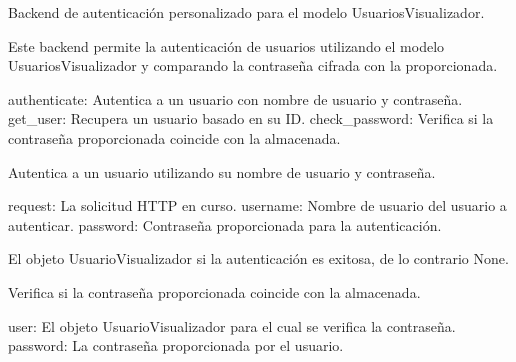 \documentclass[letterpaper,10pt,spanish]{sphinxmanual}
\begin{document}
\begin{fulllineitems}

\pysigstartsignatures
{}
\pysigstopsignatures
\sphinxAtStartPar
Backend de autenticación personalizado para el modelo UsuariosVisualizador.

\sphinxAtStartPar
Este backend permite la autenticación de usuarios utilizando el modelo
UsuariosVisualizador y comparando la contraseña cifrada con la proporcionada.
\begin{description}
\sphinxAtStartPar
authenticate: Autentica a un usuario con nombre de usuario y contraseña.
get\_user: Recupera un usuario basado en su ID.
check\_password: Verifica si la contraseña proporcionada coincide con la almacenada.

\end{description}


\begin{fulllineitems}

\pysigstartsignatures
{}
\pysigstopsignatures
\sphinxAtStartPar
Autentica a un usuario utilizando su nombre de usuario y contraseña.
\begin{description}
\sphinxAtStartPar
request: La solicitud HTTP en curso.
username: Nombre de usuario del usuario a autenticar.
password: Contraseña proporcionada para la autenticación.

\sphinxAtStartPar
El objeto UsuarioVisualizador si la autenticación es exitosa, de lo contrario None.

\end{description}

\end{fulllineitems}



\begin{fulllineitems}

\pysigstartsignatures
{}
\pysigstopsignatures
\sphinxAtStartPar
Verifica si la contraseña proporcionada coincide con la almacenada.
\begin{description}
\sphinxAtStartPar
user: El objeto UsuarioVisualizador para el cual se verifica la contraseña.
password: La contraseña proporcionada por el usuario.


\end{description}
\end{fulllineitems}
\end{fulllineitems}
\end{document}

